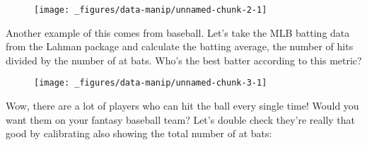 \begin{figure}[H]
  \centering
  \texttt{[image: \_figures/data-manip/unnamed-chunk-2-1]}
\end{figure}

Another example of this comes from baseball. Let's take the MLB batting
data from the Lahman package and calculate the batting average, the
number of hits divided by the number of at bats. Who's the best batter
according to this metric?

\begin{Shaded}
\begin{Highlighting}[]
 \NormalTok{)}
\StringTok{ }\StringTok{ }\NormalTok{)}
\StringTok{ }
\StringTok{ }
    \NormalTok{) /}\StringTok{ } \NormalTok{)}
\NormalTok{)}
\StringTok{ }
\StringTok{  }\NormalTok{(} \NormalTok{)}
\end{Highlighting}
\end{Shaded}

\begin{figure}[H]
  \centering
  \texttt{[image: \_figures/data-manip/unnamed-chunk-3-1]}
\end{figure}

Wow, there are a lot of players who can hit the ball every single time!
Would you want them on your fantasy baseball team? Let's double check
they're really that good by calibrating also showing the total number of
at bats:

\begin{Shaded}
\begin{Highlighting}[]
\StringTok{ }
    \NormalTok{) /}\StringTok{ } \NormalTok{),}
    \NormalTok{)}
\NormalTok{)}
\StringTok{ }
\StringTok{  }\NormalTok{(} \NormalTok{) +}\StringTok{ }
\StringTok{  }\NormalTok{()}
\end{Highlighting}
\end{Shaded}

